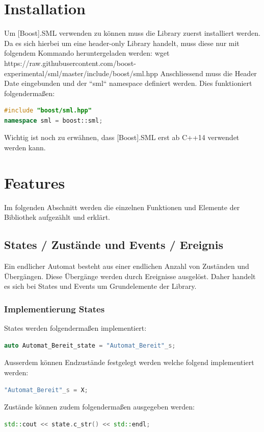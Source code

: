 \documentclass{report}
\begin{document}
\section{Installation}
Um [Boost].SML verwenden zu können muss die Library zuerst installiert werden. Da es sich hierbei um eine header-only Library handelt, muss diese nur mit folgendem Kommando heruntergeladen werden:
\newline
wget https://raw.githubusercontent.com/boost-experimental/sml/master/include/boost/sml.hpp
\newline
\vspace{5mm}
Anschliessend muss die Header Date eingebunden und der ``sml`` namespace definiert werden. Dies funktioniert folgendermaßen:
\begin{lstlisting}[language=C++]
#include "boost/sml.hpp"
namespace sml = boost::sml;
\end{lstlisting}
Wichtig ist noch zu erwähnen, dass [Boost].SML erst ab C++14 verwendet werden kann. 

\section{Features}
Im folgenden Abschnitt werden die einzelnen Funktionen und Elemente der Bibliothek aufgezählt und erklärt.

\subsection{States / Zustände und Events / Ereignis}
Ein endlicher Automat besteht aus einer endlichen Anzahl von Zuständen und Übergängen. Diese Übergänge werden durch Ereignisse ausgelöst. Daher handelt es sich bei States und Events um Grundelemente der Library. 

\subsubsection{Implementierung States}
States werden folgendermaßen implementiert: 
\begin{lstlisting}[language=C++]
auto Automat_Bereit_state = "Automat_Bereit"_s;
\end{lstlisting}
Ausserdem können Endzustände festgelegt werden welche folgend implementiert werden:
\begin{lstlisting}[language=C++]
"Automat_Bereit"_s = X;
\end{lstlisting}
Zustände können zudem folgendermaßen ausgegeben werden:
\begin{lstlisting}[language=C++]
std::cout << state.c_str() << std::endl;
\end{lstlisting}
\end{document}
